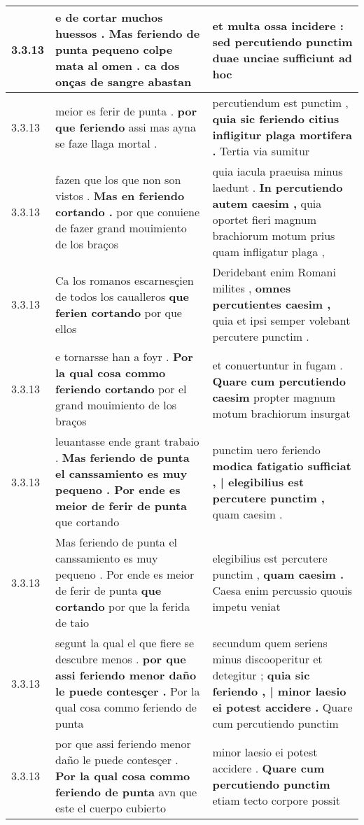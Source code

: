 \begin{tabular}{|p{1cm}|p{6.5cm}|p{6.5cm}|}
3.3.13 & e de cortar muchos huessos . \textbf{ Mas feriendo de punta pequeno colpe mata al omen . } ca dos onças de sangre abastan & et multa ossa incidere : \textbf{ sed percutiendo punctim } duae unciae sufficiunt ad hoc \\\hline
3.3.13 & meior es ferir de punta . \textbf{ por que feriendo } assi mas ayna se faze llaga mortal . & percutiendum est punctim , \textbf{ quia sic feriendo citius infligitur plaga mortifera . } Tertia via sumitur \\\hline
3.3.13 & fazen que los que non son vistos . \textbf{ Mas en feriendo cortando . } por que conuiene de fazer grand mouimiento de los braços & quia iacula praeuisa minus laedunt . \textbf{ In percutiendo autem caesim , } quia oportet fieri magnum brachiorum motum prius quam infligatur plaga , \\\hline
3.3.13 & Ca los romanos escarnesçien de todos los caualleros \textbf{ que ferien cortando } por que ellos & Deridebant enim Romani milites , \textbf{ omnes percutientes caesim , } quia et ipsi semper volebant percutere punctim . \\\hline
3.3.13 & e tornarsse han a foyr . \textbf{ Por la qual cosa commo feriendo cortando } por el grand mouimiento de los braços & et conuertuntur in fugam . \textbf{ Quare cum percutiendo caesim } propter magnum motum brachiorum insurgat \\\hline
3.3.13 & leuantasse ende grant trabaio . \textbf{ Mas feriendo de punta el canssamiento es muy pequeno . Por ende es meior de ferir de punta } que cortando & punctim uero feriendo \textbf{ modica fatigatio sufficiat , | elegibilius est percutere punctim , } quam caesim . \\\hline
3.3.13 & Mas feriendo de punta el canssamiento es muy pequeno . Por ende es meior de ferir de punta \textbf{ que cortando } por que la ferida de taio & elegibilius est percutere punctim , \textbf{ quam caesim . } Caesa enim percussio quouis impetu veniat \\\hline
3.3.13 & segunt la qual el que fiere se descubre menos . \textbf{ por que assi feriendo menor daño le puede contesçer . } Por la qual cosa commo feriendo de punta & secundum quem seriens minus discooperitur et detegitur ; \textbf{ quia sic feriendo , | minor laesio ei potest accidere . } Quare cum percutiendo punctim \\\hline
3.3.13 & por que assi feriendo menor daño le puede contesçer . \textbf{ Por la qual cosa commo feriendo de punta } avn que este el cuerpo cubierto & minor laesio ei potest accidere . \textbf{ Quare cum percutiendo punctim } etiam tecto corpore possit \\\hline

\end{tabular}
